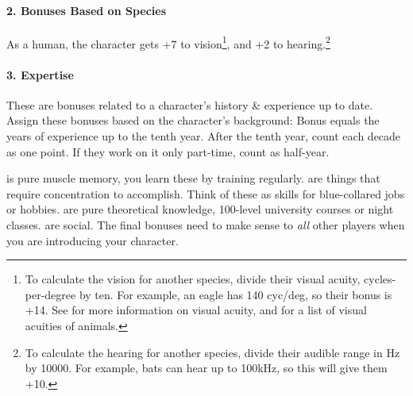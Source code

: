 \documentclass{LegrandOrangeTufteBook}
\begin{document}
\paragraph*{2. Bonuses Based on Species}
As a human, the character gets +7 to vision\footnote{
	To calculate the vision for another species, divide their visual acuity, cycles-per-degree by ten.
	For example, an eagle has 140 cyc/deg, so their bonus is +14.
	See \cite{caves_acuityview_2018} for more information on visual acuity,
	and \cite{noauthor_list_2019} for a list of visual acuities of animals.
},
and +2 to hearing.\footnote{
	To calculate the hearing for another species, divide their audible range in Hz by 10000.
	For example, bats can hear up to 100kHz, so this will give them +10.
}



\paragraph*{3. Expertise}

These are bonuses related to a character's history \& experience up to date.
Assign these bonuses based on the character's background:
Bonus equals the years of experience up to the tenth year.
After the tenth year, count each decade as one point.
If they work on it only part-time, count as half-year.\\
\begin{marginNote}
	
\end{marginNote}
 is pure muscle memory, you learn these by training regularly.
 are things that require concentration to accomplish. Think of these as skills for blue-collared jobs or hobbies.
 are pure theoretical knowledge, 100-level university courses or night classes.
 are social.
The final bonuses need to make sense to \emph{all} other players when you are introducing your character.\\




\end{document}
